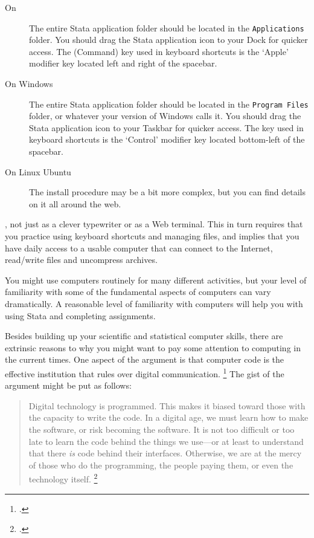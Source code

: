 \begin{description}

  \item[On \OSX] %
  The entire Stata application folder should be located in the \texttt{Applications} folder. You should drag the Stata application icon to your Dock for quicker access. The  (Command) key used in keyboard shortcuts is the `Apple' modifier key located left and right of the spacebar.%

  \item[On Windows] %
  The entire Stata application folder should be located in the \texttt{Program Files} folder, or whatever your version of Windows calls it. You should drag the Stata application icon to your Taskbar for quicker access. The  key used in keyboard shortcuts is the `Control' modifier key located bottom-left of the spacebar.%
  
  \item[On Linux Ubuntu] %
  The install procedure may be a bit more complex, but you can find details on it all around the web.%

\end{description}

%
, not just as a clever typewriter or as a Web terminal. This in turn requires that you practice using keyboard shortcuts and managing files, and implies that you have daily access to a usable computer that can connect to the Internet, read/write \PDF files and uncompress \ZIP archives.%

You might use computers routinely for many different activities, but your level of familiarity with some of the fundamental aspects of computers can vary dramatically. A reasonable level of familiarity with computers will help you with using Stata and completing assignments.%

Besides building up your scientific and statistical computer skills, there are extrinsic reasons to why you might want to pay some attention to computing in the current times. One aspect of the argument is that computer code is the effective institution that rules over digital communication.%
  \footcite{Lessig:2006} %
  The gist of the argument might be put as follows: %

\begin{quote}%
Digital technology is programmed. This makes it biased toward those with the capacity to write the code. In a digital age, we must learn how to make the software, or risk becoming the software. It is not too difficult or too late to learn the code behind the things we use—or at least to understand that there \emph{is} code behind their interfaces. Otherwise, we are at the mercy of those who do the programming, the people paying them, or even the technology itself.%
\footcite[p.~128]{Rushkoff:2010}%
\end{quote}

